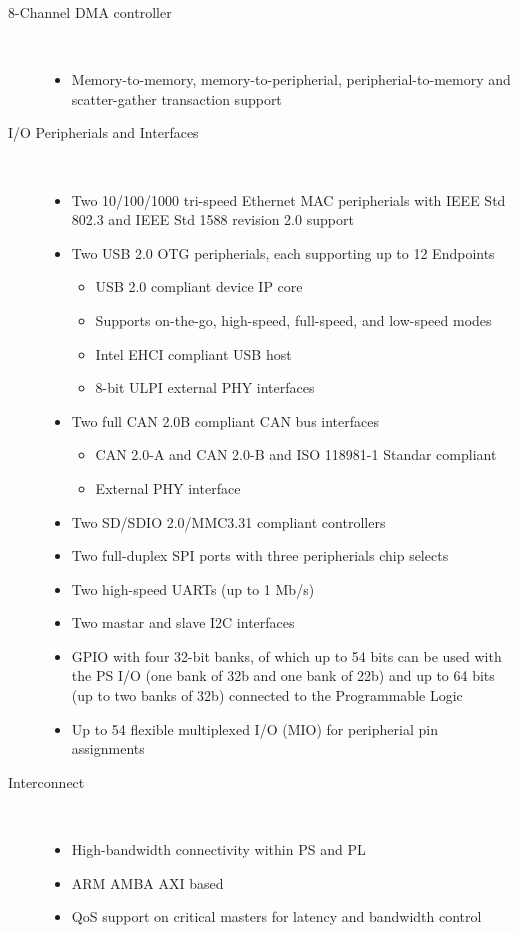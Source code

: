 \begin{description}
	\item[8-Channel DMA controller] \hfill \\
	\begin{itemize}
		\item Memory-to-memory, memory-to-peripherial, peripherial-to-memory and scatter-gather transaction support
	\end{itemize}

	\item[I/O Peripherials and Interfaces] \hfill \\
	\begin{itemize}
		\item Two 10/100/1000 tri-speed Ethernet MAC peripherials with IEEE Std 802.3 and IEEE Std 1588 revision 2.0 support
		\item Two USB 2.0 OTG peripherials, each supporting up to 12 Endpoints
		\begin{itemize}
			\item USB 2.0 compliant device IP core
			\item Supports on-the-go, high-speed, full-speed, and low-speed modes
			\item Intel EHCI compliant USB host
			\item 8-bit ULPI external PHY interfaces
		\end{itemize}
		\item Two full CAN 2.0B compliant CAN bus interfaces
		\begin{itemize}
			\item CAN 2.0-A and CAN 2.0-B and ISO 118981-1 Standar compliant
			\item External PHY interface
		\end{itemize}
		\item Two SD/SDIO 2.0/MMC3.31 compliant controllers
		\item Two full-duplex SPI ports with three peripherials chip selects
		\item Two high-speed UARTs (up to 1 Mb/s)
		\item Two mastar and slave I2C interfaces
		\item GPIO with four 32-bit banks, of which up to 54 bits can be used with the PS I/O (one bank of 32b and one bank of 22b) and up to 64 bits (up to two banks of 32b) connected to the Programmable Logic
		\item Up to 54 flexible multiplexed I/O (MIO) for peripherial pin assignments
	\end{itemize}

	\item[Interconnect] \hfill \\
	\begin{itemize}
		\item High-bandwidth connectivity within PS and PL
		\item ARM AMBA AXI based
		\item QoS support on critical masters for latency and bandwidth control
	\end{itemize}
\end{description}


